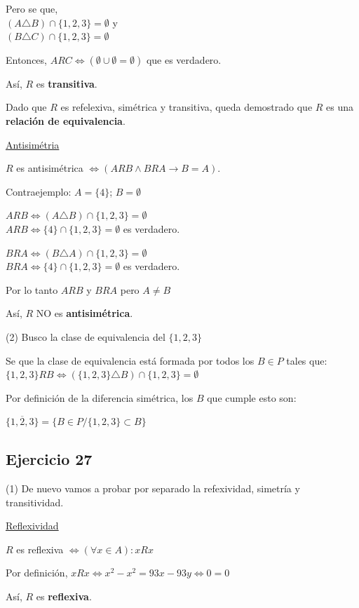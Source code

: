 Pero se que, \\ $(A \triangle B) \cap \{ 1,2,3 \} = \emptyset$ y \\ $(B \triangle C) \cap \{ 1,2,3 \} = \emptyset$

Entonces, $ ARC \iff (\emptyset \cup \emptyset = \emptyset) $ que es verdadero.

Así, $R$ es \textbf{transitiva}.

Dado que $R$ es refelexiva, simétrica y transitiva, queda demostrado que $R$ es una \textbf{relación de equivalencia}.

\underline{Antisimétria}

$R$ es antisimétrica $\iff (ARB \wedge BRA \rightarrow B=A)$.

Contraejemplo: $A = \{ 4 \}$; $B = \emptyset$

$ARB \iff (A \triangle B) \cap \{ 1,2,3 \} = \emptyset$ \\
$ARB \iff \{ 4 \} \cap \{ 1,2,3 \} = \emptyset$ es verdadero.

$BRA \iff (B \triangle A) \cap \{ 1,2,3 \} = \emptyset$ \\
$BRA \iff \{ 4 \} \cap \{ 1,2,3 \} = \emptyset$ es verdadero.

Por lo tanto $ARB$ y $BRA$ pero $A\neq B$

Así, $R$ NO es \textbf{antisimétrica}.

(2) Busco la clase de equivalencia del $\{ 1,2,3 \}$

Se que la clase de equivalencia está formada por todos los $B\in P$ tales que:\\
$\{ 1,2,3 \}RB \iff (\{ 1,2,3 \} \triangle B) \cap \{ 1,2,3 \} = \emptyset$

Por definición de la diferencia simétrica, los $B$ que cumple esto son:

$ \overline{\{ 1,2,3 \}} = \{B \in P / \{ 1,2,3 \} \subset B \}$

\subsection{Ejercicio 27}
(1) De nuevo vamos a probar por separado la refexividad, simetría y transitividad.

\underline{Reflexividad}

$R$ es reflexiva $\iff (\forall x \in A): xRx$

Por definición, $xRx \iff x^2 - x^2 = 93x - 93y \iff 0 = 0$

Así, $R$ es \textbf{reflexiva}.

